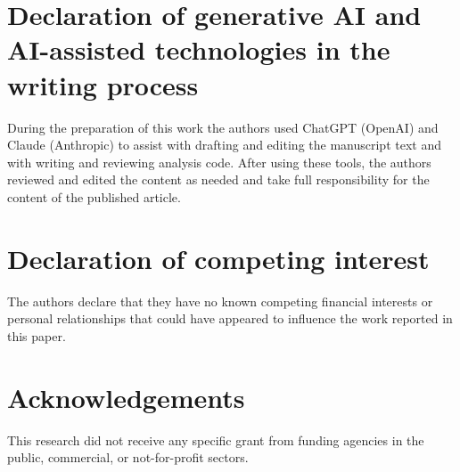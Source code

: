 \documentclass[a4paper,fleqn]{cas-sc}
\begin{document}
\section*{Declaration of generative AI and AI-assisted technologies in the writing process}
During the preparation of this work the authors used ChatGPT (OpenAI) and Claude (Anthropic) to assist with drafting and editing the manuscript text and with writing and reviewing analysis code. After using these tools, the authors reviewed and edited the content as needed and take full responsibility for the content of the published article.

\printcredits

\section*{Declaration of competing interest}
The authors declare that they have no known competing financial interests or personal relationships that could have appeared to influence the work reported in this paper.

\section*{Acknowledgements}
This research did not receive any specific grant from funding agencies in the public, commercial, or not-for-profit sectors.
\end{document}
